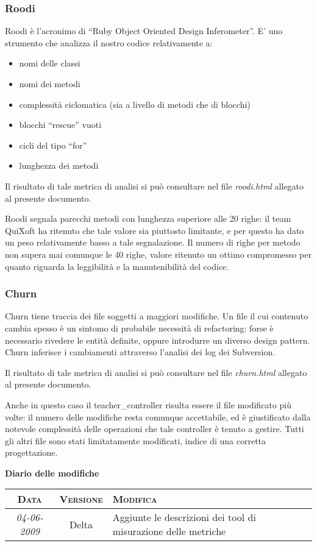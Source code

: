 \documentclass[11pt,a4paper]{article}
\newcommand{\modifiche} 
{
\newpage
\begin{center}
\textbf{Diario delle modifiche} \\
\bigskip
\begin{tabular}{|c|c|p{0.61\textwidth}|}
\hline
\textsc{Data} & \textsc{Versione} & \textsc{Modifica} \\
\hline
\hline
\textit{04-06-2009} & Delta & Aggiunte le descrizioni dei tool di misurazione delle metriche  \\
\hline
\end{tabular}
\end{center}
}
\begin{document}
\subsubsection{Roodi}
Roodi è l’acronimo di “Ruby Object Oriented Design Inferometer”. E’ uno strumento che analizza il nostro codice relativamente a:
\begin{itemize}
 \item nomi delle classi
 \item nomi dei metodi
 \item complessità ciclomatica (sia a livello di metodi che di blocchi)
 \item blocchi “rescue” vuoti
 \item cicli del tipo “for”
 \item lunghezza dei metodi
\end{itemize}
Il risultato di tale metrica di analisi si può consultare nel file \textit{roodi.html} allegato al presente documento.

Roodi segnala parecchi metodi con lunghezza superiore alle 20 righe: il team QuiXoft ha ritenuto che tale valore sia piuttosto limitante, e per questo ha dato un peso relativamente basso a tale segnalazione. Il numero di righe per metodo non supera mai comunque le 40 righe, valore ritenuto un ottimo compromesso per quanto riguarda la leggibilità e la manutenibilità del codice.
\subsubsection{Churn}
Churn tiene traccia dei file soggetti a maggiori modifiche. Un file il cui contenuto cambia spesso è un sintomo di probabile necessità di refactoring: forse è necessario rivedere le entità definite, oppure introdurre un diverso design pattern.
Churn inferisce i cambiamenti attraverso l’analisi dei log dei Subversion.

Il risultato di tale metrica di analisi si può consultare nel file \textit{churn.html} allegato al presente documento.

Anche in questo caso il teacher\_controller risulta essere il file modificato più volte: il numero delle modifiche resta comunque accettabile, ed è giustificato dalla notevole complessità delle operazioni che tale controller è tenuto a gestire.
Tutti gli altri file sono stati limitatamente modificati, indice di una corretta progettazione.
\modifiche
\end{document}
